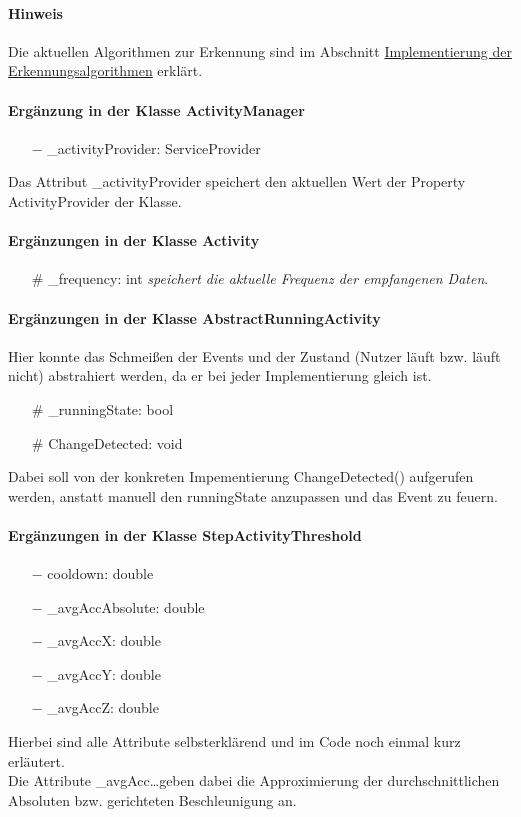 \documentclass[a4paper,12pt]{article}
\begin{document}
\paragraph{Hinweis}
Die aktuellen Algorithmen zur Erkennung sind im Abschnitt \hyperref[algorithmen]{Implementierung der Erkennungsalgorithmen} erklärt.
\paragraph{Ergänzung in der Klasse ActivityManager}
\begin{itemize}
	\item [$-$]\_activityProvider: ServiceProvider 
\end{itemize}
Das Attribut \_activityProvider speichert den aktuellen Wert der Property ActivityProvider der Klasse.
\paragraph{Ergänzungen in der Klasse Activity}
\begin{itemize}
	\item [\#] \_frequency: int \textit{speichert die aktuelle Frequenz der empfangenen Daten}.
\end{itemize}
\paragraph{Ergänzungen in der Klasse AbstractRunningActivity}
Hier konnte das Schmeißen der Events und der Zustand (Nutzer läuft bzw. läuft nicht) abstrahiert werden, da er bei jeder Implementierung gleich ist.
\begin{itemize}
	\item [\#] \_runningState: bool
	\item [\#] ChangeDetected: void 
\end{itemize}
Dabei soll von der konkreten Impementierung ChangeDetected() aufgerufen werden, anstatt manuell den runningState anzupassen und das Event zu feuern.
\paragraph{Ergänzungen in der Klasse StepActivityThreshold}
\begin{itemize}
	\item [$-$] cooldown: double
	\item [$-$] \_avgAccAbsolute: double
	\item [$-$] \_avgAccX: double
	\item [$-$] \_avgAccY: double
	\item [$-$] \_avgAccZ: double
\end{itemize}
Hierbei sind alle Attribute selbsterklärend und im Code noch einmal kurz erläutert.\\
Die Attribute \_avgAcc\dots geben dabei die Approximierung der durchschnittlichen Absoluten bzw. gerichteten Beschleunigung an.
\end{document}
